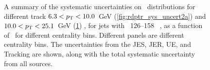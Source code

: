 \begin{figure}
\begin{subfigure}[b]{\textwidth}
    \caption{}
    \label{fig:rdptr_sys_uncert2b}
\end{subfigure}\hfill
   \caption{A summary of the systematic uncertainties on \RDptr\ distributions for different track \mbox{$6.3 < \mbox{$p_{\mathrm{T}}$} < 10.0$ GeV} (\ref{fig:rdptr_sys_uncert2a}) and \mbox{$10.0 < \mbox{$p_{\mathrm{T}}$} < 25.1$ GeV} (\ref{fig:rdptr_sys_uncert2b}) , for jets with \pt\ 126--158 \GeV\ , as a function of \rvar\ for different centrality bins. Different panels are different centrality bins. The uncertainties from the JES, JER, UE, and Tracking  are shown, along with the total systematic uncertainty from all sources. }
\label{fig:rdptr_sys_uncert2}
\end{figure}




